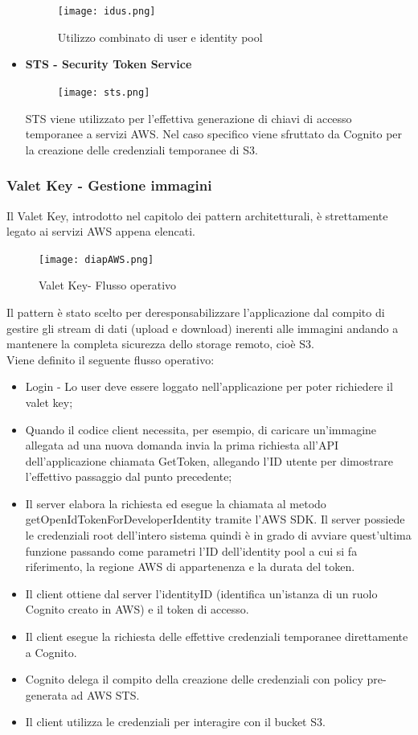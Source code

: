 \documentclass[12pt]{article}
\begin{document}
\begin{itemize}
\begin{itemize}
				\end{itemize}
				\begin{figure}[H]
					\texttt{[image: idus.png]}
					\caption{Utilizzo combinato di user e identity pool}
				\end{figure}
				\item \textbf{STS - Security Token Service}
				\begin{figure}[H]
					\texttt{[image: sts.png]}
				\end{figure}
				STS viene utilizzato per l'effettiva generazione di chiavi di accesso temporanee a servizi AWS. Nel caso specifico viene sfruttato da Cognito per la creazione delle credenziali temporanee di S3.
				
			\end{itemize}
			
			
			\subsubsection{Valet Key - Gestione immagini}
			\label{sec:valet}
			Il Valet Key, introdotto nel capitolo dei pattern architetturali, è strettamente legato ai servizi AWS appena elencati.
			\begin{figure}[H]
				\texttt{[image: diapAWS.png]}
				\caption{Valet Key- Flusso operativo}
			\end{figure}
			Il pattern è stato scelto per deresponsabilizzare l'applicazione dal compito di gestire gli stream di dati (upload e download) inerenti alle immagini andando a mantenere la completa sicurezza dello storage remoto, cioè S3.\\
			Viene definito il seguente flusso operativo:
			\begin{itemize}
				\item Login - Lo user deve essere loggato nell'applicazione per poter richiedere il valet key;
				\item Quando il codice client necessita, per esempio, di caricare un'immagine allegata ad una nuova domanda invia la prima richiesta all'API dell'applicazione chiamata GetToken, allegando l'ID utente per dimostrare l'effettivo passaggio dal punto precedente;
				\item Il server elabora la richiesta ed esegue la chiamata al metodo getOpenIdTokenForDeveloperIdentity tramite l'AWS SDK. Il server possiede le credenziali root dell'intero sistema quindi è in grado di avviare quest'ultima funzione passando come parametri l'ID dell'identity pool a cui si fa riferimento, la regione AWS di appartenenza e la durata del token.
				\item Il client ottiene dal server l'identityID (identifica un'istanza di un ruolo Cognito creato in AWS) e il token di accesso.
				\item Il client esegue la richiesta delle effettive credenziali temporanee direttamente a Cognito.
				\item Cognito delega il compito della creazione delle credenziali con policy pre-generata ad AWS STS.
				\item Il client utilizza le credenziali per interagire con il bucket S3.
			\end{itemize}
\end{document}
